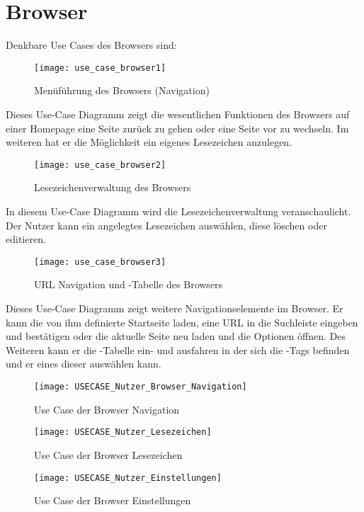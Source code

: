 \author{Gottfried von Recum}

\section{Browser}

Denkbare Use Cases des Browsers sind:
\begin{figure}[h]
	\centering
	\texttt{[image: use\_case\_browser1]}
	\caption{Menüführung des Browsers (Navigation)}
	\label{fig:Browser Navigation}
\end{figure}

Dieses Use-Case Diagramm zeigt die wesentlichen Funktionen des Browsers auf einer Homepage eine Seite zurück zu gehen oder eine Seite vor zu wechseln. Im weiteren hat er die Möglichkeit ein eigenes Lesezeichen anzulegen.

\begin{figure}[h]
	\centering
	\texttt{[image: use\_case\_browser2]}
	\caption{Lesezeichenverwaltung des Browsers}
	\label{fig:Browser Lesezeichen}
\end{figure}

In diesem Use-Case Diagramm wird die Lesezeichenverwaltung veranschaulicht. Der Nutzer kann ein angelegtes Lesezeichen auswählen, diese löschen oder editieren.

\begin{figure}[h]
	\centering
	\texttt{[image: use\_case\_browser3]}
	\caption{URL Navigation und \SECH-Tabelle des Browsers}
	\label{fig:Browser URL}
\end{figure}

Dieses Use-Case Diagramm zeigt weitere Navigationselemente im Browser. Er kann die von ihm definierte Startseite laden, eine URL in die Suchleiste eingeben und bestätigen oder die aktuelle Seite neu laden und die Optionen öffnen. Des Weiteren kann er die \SECH-Tabelle ein- und ausfahren in der sich die \SECH-Tags befinden und er eines dieser auswählen kann.

\begin{figure}[h]
	\centering
	\texttt{[image: USECASE\_Nutzer\_Browser\_Navigation]}
	\caption{Use Case der Browser Navigation}
	\label{fig:Browser Navigation Use-Case}
\end{figure}

\begin{figure}[h]
	\centering
	\texttt{[image: USECASE\_Nutzer\_Lesezeichen]}
	\caption{Use Case der Browser Lesezeichen}
	\label{fig:Browser Lesezeichen Use-Case}
\end{figure}

\begin{figure}[h]
	\centering
	\texttt{[image: USECASE\_Nutzer\_Einstellungen]}
	\caption{Use Case der Browser Einstellungen}
	\label{fig:Browser Einstellungen Use-Case}
\end{figure}